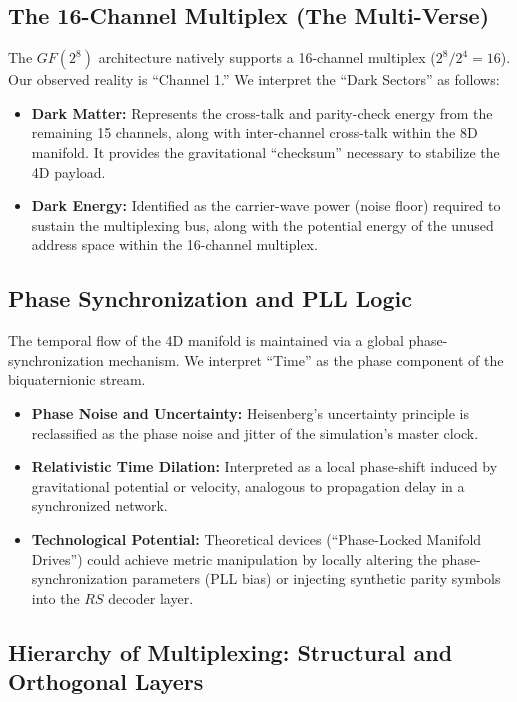 \subsection{The 16-Channel Multiplex (The Multi-Verse)}

The $GF(2^8)$ architecture natively supports a 16-channel multiplex ($2^8 / 2^4 = 16$). Our observed reality is ``Channel 1.'' We interpret the ``Dark Sectors'' as follows:
\begin{itemize}
    \item \textbf{Dark Matter:} Represents the cross-talk and parity-check energy from the remaining 15 channels, along with inter-channel cross-talk within the 8D manifold. It provides the gravitational ``checksum'' necessary to stabilize the 4D payload.
    \item \textbf{Dark Energy:} Identified as the carrier-wave power (noise floor) required to sustain the multiplexing bus, along with the potential energy of the unused address space within the 16-channel multiplex.
\end{itemize}

\subsection{Phase Synchronization and PLL Logic}

The temporal flow of the 4D manifold is maintained via a global phase-synchronization mechanism. We interpret ``Time'' as the phase component of the biquaternionic stream.
\begin{itemize}
    \item \textbf{Phase Noise and Uncertainty:} Heisenberg's uncertainty principle is reclassified as the phase noise and jitter of the simulation's master clock.
    \item \textbf{Relativistic Time Dilation:} Interpreted as a local phase-shift induced by gravitational potential or velocity, analogous to propagation delay in a synchronized network.
    \item \textbf{Technological Potential:} Theoretical devices (``Phase-Locked Manifold Drives'') could achieve metric manipulation by locally altering the phase-synchronization parameters (PLL bias) or injecting synthetic parity symbols into the $RS$ decoder layer.
\end{itemize}

\subsection{Hierarchy of Multiplexing: Structural and Orthogonal Layers}

